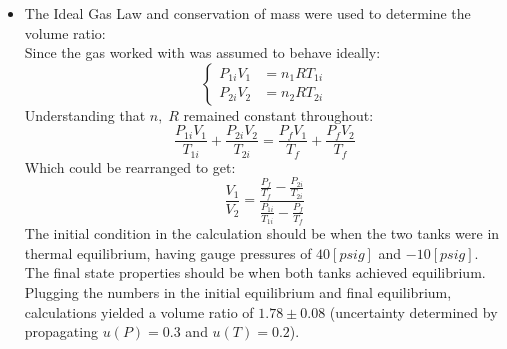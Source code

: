 \documentclass[12pt]{article}
\begin{document}
\begin{itemize}
    \item The Ideal Gas Law and conservation of mass were used to determine the volume ratio:\\
    Since the gas worked with was assumed to behave ideally:
    \begin{equation}
        \begin{cases}
            P_{1i}V_1&=n_1RT_{1i}\\
            P_{2i}V_2&=n_2RT_{2i}
        \end{cases}
    \end{equation}
    Understanding that $n,\;R$ remained constant throughout:
    \begin{equation}
        \frac{P_{1i}V_1}{T_{1i}}+\frac{P_{2i}V_2}{T_{2i}}=\frac{P_fV_1}{T_f}+\frac{P_fV_2}{T_f}
    \end{equation}
    Which could be rearranged to get:
    \begin{equation}
        \frac{V_1}{V_2}={\frac{\frac{P_{f}}{T_{f}}-\frac{P_{2i}}{T_{2i}}}{\frac{P_{1i}}{T_{1i}}-\frac{P_{f}}{T_{f}}}}
    \end{equation}
    The initial condition in the calculation should be when the two tanks were in thermal equilibrium, having gauge pressures of $40[psig]$ and $-10[psig]$. The final state properties should be when both tanks achieved equilibrium. Plugging the numbers in the initial equilibrium and final equilibrium, calculations yielded a volume ratio of $1.78\pm0.08$ (uncertainty determined by propagating $u(P)=0.3$ and $u(T)=0.2$).

\end{itemize}
\end{document}
